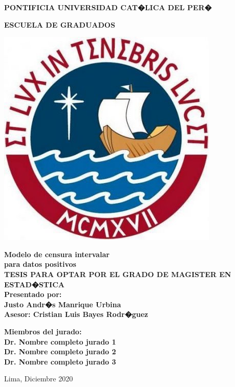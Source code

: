 \documentclass[11pt,oneside,a4paper]{book}
\begin{document}
\frontmatter \onehalfspacing

\thispagestyle{empty}
\begin{center}
\vspace*{1cm}
\textbf{\Large{PONTIFICIA UNIVERSIDAD CAT�LICA DEL PER� }}\\
\vspace*{1.2cm}

\textbf{\Large{ESCUELA DE GRADUADOS}}\\
\vspace*{0.5cm}
\begin{center}
\includegraphics[scale=.25]{logoPUCP}
\end{center}
\vspace{0.5cm}

\textbf{\Large{Modelo de censura intervalar\\
  para datos positivos}}\\
\vspace{1.2cm}
\textbf{\large{TESIS PARA OPTAR POR EL GRADO DE MAGISTER EN\\
  ESTAD�STICA}}\\
  
\vspace*{1.2cm}
\textbf{\large{Presentado por:}}\\
\vspace*{0.3cm}
\textbf{\large{Justo Andr�s Manrique Urbina}}\\
\vspace*{1.2cm}
\textbf{\large{Asesor: Cristian Luis Bayes Rodr�guez}}\\

\vspace*{1.2cm}

\textbf{\large{Miembros del jurado:\\
	Dr. Nombre completo jurado 1 \\
	Dr. Nombre completo jurado 2 \\
	Dr. Nombre completo jurado 3  
	}} 
	   
\vspace*{1.2cm}
    
\normalsize{Lima, Diciembre 2020}
\end{center}
\end{document}
